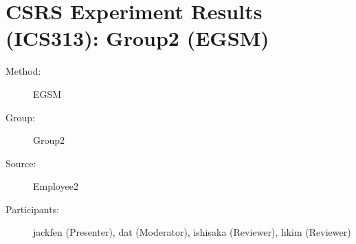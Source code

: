 
%          
	  
\chapter {CSRS Experiment Results (ICS313): Group2 (EGSM)}
\small

\begin{description}
\item [Method:] EGSM
\item [Group:] Group2
\item [Source:] Employee2
\item [Participants:] jackfen (Presenter), dat (Moderator), ishisaka (Reviewer), hkim (Reviewer)
\end{description}
